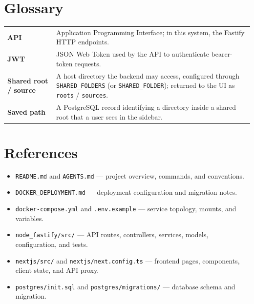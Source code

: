 \documentclass[10pt]{article}
\begin{document}
\section{Glossary}
\begin{tabularx}{\linewidth}{>{\bfseries}p{4cm}X}
API & Application Programming Interface; in this system, the Fastify HTTP endpoints. \\
JWT & JSON Web Token used by the API to authenticate bearer-token requests. \\
Shared root / source & A host directory the backend may access, configured through \texttt{SHARED\_FOLDERS} (or \texttt{SHARED\_FOLDER}); returned to the UI as \texttt{roots} / \texttt{sources}. \\
Saved path & A PostgreSQL record identifying a directory inside a shared root that a user sees in the sidebar. \\
\end{tabularx}

\section{References}
\begin{itemize}
  \item \texttt{README.md} and \texttt{AGENTS.md} --- project overview, commands, and conventions.
  \item \texttt{DOCKER\_DEPLOYMENT.md} --- deployment configuration and migration notes.
  \item \texttt{docker-compose.yml} and \texttt{.env.example} --- service topology, mounts, and variables.
  \item \texttt{node\_fastify/src/} --- API routes, controllers, services, models, configuration, and tests.
  \item \texttt{nextjs/src/} and \texttt{nextjs/next.config.ts} --- frontend pages, components, client state, and API proxy.
  \item \texttt{postgres/init.sql} and \texttt{postgres/migrations/} --- database schema and migration.
\end{itemize}
\end{document}
